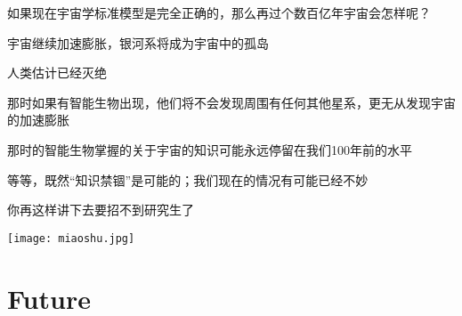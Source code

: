 \documentclass[CJK]{beamer}
\begin{document}
\begin{frame}
\bch
如果现在宇宙学标准模型是完全正确的，那么再过个数百亿年宇宙会怎样呢？

\bitem
\item{宇宙继续加速膨胀，银河系将成为宇宙中的孤岛}
\item{人类估计已经灭绝}
\item{那时如果有智能生物出现，他们将不会发现周围有任何其他星系，更无从发现宇宙的加速膨胀}
\item{那时的智能生物掌握的关于宇宙的知识可能永远停留在我们100年前的水平}
  \eitem
\ech
\end{frame}

\begin{frame}
\bch
等等，既然“知识禁锢”是可能的；我们现在的情况有可能已经不妙\wulian
\ech
\end{frame}


\begin{frame}
\bch
\skipline
\begin{minipage}{0.4\textwidth}

你再这样讲下去要招不到研究生了
\vskip 2in
\ 
\end{minipage}
\texttt{[image: miaoshu.jpg]}
\ech
\end{frame}

\section{Future}

\begin{frame}
\bch
{}
\ech
\end{frame}
\end{document}
